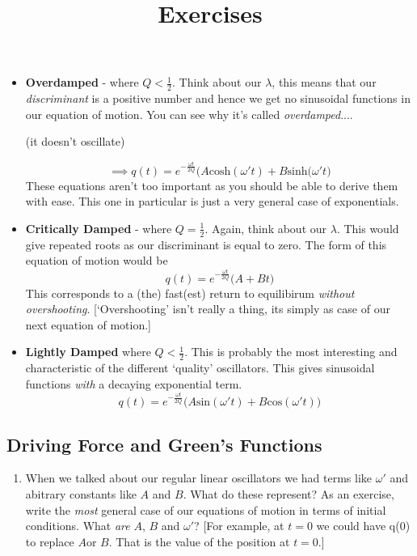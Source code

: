 \begin{itemize}
\item \textbf{Overdamped} - where $Q < \frac{1}{2}$. Think about our $\lambda$, this means that our \textit{discriminant} is a positive number and hence we get no sinusoidal functions in our equation of motion. You can see why it's called \textit{overdamped}.... \begin{tiny}(it doesn't oscillate) 
\end{tiny}
\begin{equation}
\implies q(t) = e^{-\frac{\omega t}{2Q}}\Big(A\textrm{cosh}(\omega't) + B\textrm{sinh}(\omega't\Big)
\end{equation}
These equations aren't too important as you should be able to derive them with ease. This one in particular is just a very general case of exponentials. 
\item \textbf{Critically Damped} - where $Q = \frac{1}{2}$. Again, think about our $\lambda$. This would give repeated roots as our discriminant is equal to zero. The form of this equation of motion would be 
\begin{equation}
q(t) = e^{-\frac{\omega t}{2Q}}\Big(A+Bt\Big)
\end{equation}
This corresponds to a (the) fast(est) return to equilibirum \textit{without overshooting}. [`Overshooting' isn't really a thing, its simply as case of our next equation of motion.] 
\item \textbf{Lightly Damped} where $Q < \frac{1}{2}$. This is probably the most interesting and characteristic of the different `quality' oscillators. This gives sinusoidal functions \textit{with} a decaying exponential term.
\begin{equation}
q(t) = e^{-\frac{\omega t}{2Q}}\Big(A\textrm{sin}(\omega' t) + B\textrm{cos}(\omega 't)\Big)
\end{equation}
\end{itemize}

\subsection{Driving Force and Green's Functions}




\title{Exercises}
\begin{enumerate}
\item When we talked about our regular linear oscillators we had terms like $\omega'$ and abitrary constants like $A$ and $B$. What do these represent? As an exercise, write the \textit{most} general case of our equations of motion in terms of initial conditions. What \textit{are} $A$, $B$ and $\omega'$?  [For example, at $t=0$ we could have q(0) to replace $A$or $B$. That is the value of the position at $t=0$.]
\end{enumerate}




